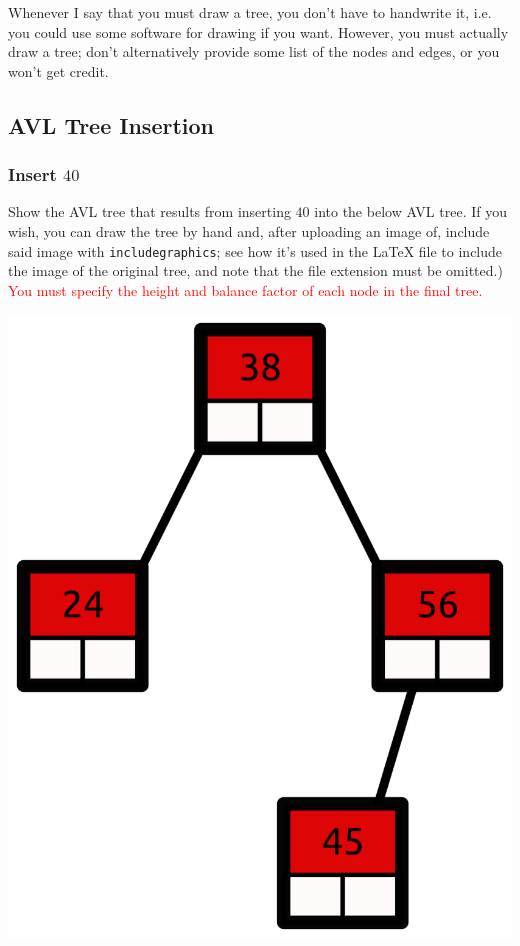 \documentclass{article}
\begin{document}
Whenever I say that you must draw a tree, you don't have to handwrite it, i.e. you could use some software for drawing if you want. However, you must actually draw a tree; don't alternatively provide some list of the nodes and edges, or you won't get credit.

\subsection{AVL Tree Insertion}

\subsubsection{Insert $40$}

Show the AVL tree that results from inserting $40$ into the below AVL tree. If you wish, you can draw the tree by hand and, after uploading an image of, include said image with \lstinline{includegraphics}; see how it's used in the LaTeX file to include the image of the original tree, and note that the file extension must be omitted.) \textcolor{red}{You must specify the height and balance factor of each node in the final tree.}

\includegraphics[scale=0.35]{avl_tree_insert_problem}
\end{document}
